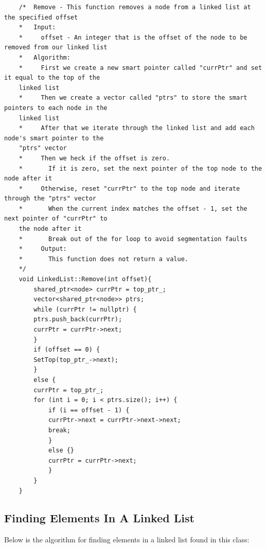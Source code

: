 \documentclass[a4paper,9pt]{article}
\begin{document}
\begin{highlight}
    \begin{verbatim}
    /*  Remove - This function removes a node from a linked list at the specified offset
    *   Input:
    *     offset - An integer that is the offset of the node to be removed from our linked list
    *   Algorithm:
    *     First we create a new smart pointer called "currPtr" and set it equal to the top of the 
    linked list
    *     Then we create a vector called "ptrs" to store the smart pointers to each node in the 
    linked list
    *     After that we iterate through the linked list and add each node's smart pointer to the 
    "ptrs" vector
    *     Then we heck if the offset is zero.
    *       If it is zero, set the next pointer of the top node to the node after it
    *     Otherwise, reset "currPtr" to the top node and iterate through the "ptrs" vector
    *       When the current index matches the offset - 1, set the next pointer of "currPtr" to 
    the node after it
    *       Break out of the for loop to avoid segmentation faults
    *     Output:
    *       This function does not return a value.
    */
    void LinkedList::Remove(int offset){
        shared_ptr<node> currPtr = top_ptr_;
        vector<shared_ptr<node>> ptrs;
        while (currPtr != nullptr) {
        ptrs.push_back(currPtr);
        currPtr = currPtr->next;
        }
        if (offset == 0) {
        SetTop(top_ptr_->next);
        }
        else {
        currPtr = top_ptr_;
        for (int i = 0; i < ptrs.size(); i++) {
            if (i == offset - 1) {
            currPtr->next = currPtr->next->next;
            break;
            }
            else {}
            currPtr = currPtr->next;
            }
        }
    }
    \end{verbatim}
\end{highlight}

\subsection*{Finding Elements In A Linked List}

Below is the algorithm for finding elements in a linked list found in this class:
\end{document}
